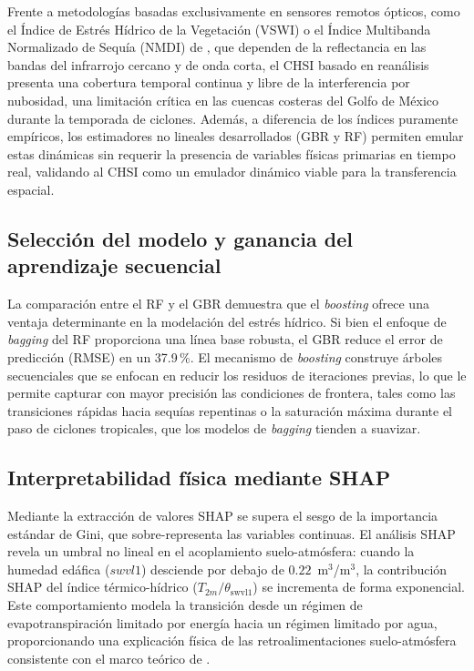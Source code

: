 \documentclass[12pt, a4paper]{article}
\begin{document}
Frente a metodologías basadas exclusivamente en sensores remotos ópticos, como el Índice de Estrés Hídrico de la Vegetación (VSWI) o el Índice Multibanda Normalizado de Sequía (NMDI) de \textcite{ghafari2024spatial}, que dependen de la reflectancia en las bandas del infrarrojo cercano y de onda corta, el CHSI basado en reanálisis presenta una cobertura temporal continua y libre de la interferencia por nubosidad, una limitación crítica en las cuencas costeras del Golfo de México durante la temporada de ciclones. Además, a diferencia de los índices puramente empíricos, los estimadores no lineales desarrollados (GBR y RF) permiten emular estas dinámicas sin requerir la presencia de variables físicas primarias en tiempo real, validando al CHSI como un emulador dinámico viable para la transferencia espacial.

\subsection{Selección del modelo y ganancia del aprendizaje secuencial}

La comparación entre el RF y el GBR demuestra que el \emph{boosting} ofrece una ventaja determinante en la modelación del estrés hídrico. Si bien el enfoque de \emph{bagging} del RF proporciona una línea base robusta, el GBR reduce el error de predicción (RMSE) en un 37.9\,\%. El mecanismo de \emph{boosting} construye árboles secuenciales que se enfocan en reducir los residuos de iteraciones previas, lo que le permite capturar con mayor precisión las condiciones de frontera, tales como las transiciones rápidas hacia sequías repentinas o la saturación máxima durante el paso de ciclones tropicales, que los modelos de \emph{bagging} tienden a suavizar.

\subsection{Interpretabilidad física mediante SHAP}

Mediante la extracción de valores SHAP se supera el sesgo de la importancia estándar de Gini, que sobre-representa las variables continuas. El análisis SHAP revela un umbral no lineal en el acoplamiento suelo-atmósfera: cuando la humedad edáfica ($swvl1$) desciende por debajo de $0.22$~m$^3$/m$^3$, la contribución SHAP del índice térmico-hídrico ($T_{2m}/\theta_{\text{swvl1}}$) se incrementa de forma exponencial. Este comportamiento modela la transición desde un régimen de evapotranspiración limitado por energía hacia un régimen limitado por agua, proporcionando una explicación física de las retroalimentaciones suelo-atmósfera consistente con el marco teórico de \textcite{seneviratne2010investigating}.
\end{document}
